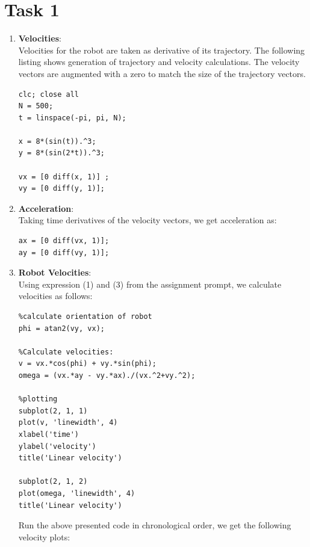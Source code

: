 \documentclass[12pt,letterpaper]{article}
\begin{document}
\section*{Task 1}



\begin{enumerate}
  \item
   \textbf{Velocities}: \\
   Velocities for the robot are taken as derivative of its trajectory. The following listing shows generation of trajectory and velocity calculations. The velocity vectors are augmented with a zero to match the size of the trajectory vectors.
\begin{lstlisting}
clc; close all 
N = 500; 
t = linspace(-pi, pi, N); 

x = 8*(sin(t)).^3; 
y = 8*(sin(2*t)).^3; 

vx = [0 diff(x, 1)] ;
vy = [0 diff(y, 1)];
\end{lstlisting}
  \item
\textbf{Acceleration}:\\
Taking time derivatives of the velocity vectors, we get acceleration as: 

\begin{lstlisting}
ax = [0 diff(vx, 1)];
ay = [0 diff(vy, 1)];
\end{lstlisting}

\item 
\textbf{Robot Velocities}:\\
Using expression (1) and (3) from the assignment prompt, we calculate velocities as follows: 
\begin{lstlisting}
%calculate orientation of robot
phi = atan2(vy, vx); 

%Calculate velocities: 
v = vx.*cos(phi) + vy.*sin(phi); 
omega = (vx.*ay - vy.*ax)./(vx.^2+vy.^2); 

%plotting
subplot(2, 1, 1)
plot(v, 'linewidth', 4)
xlabel('time')
ylabel('velocity')
title('Linear velocity')

subplot(2, 1, 2)
plot(omega, 'linewidth', 4)
title('Linear velocity')
\end{lstlisting}

Run the above presented code in chronological order, we get the following velocity plots:


\end{enumerate}
\end{document}
